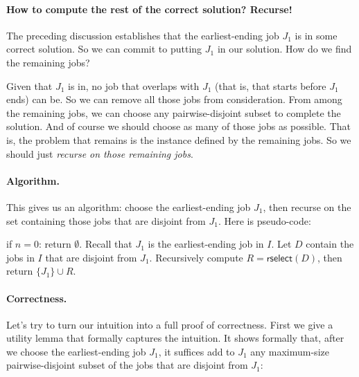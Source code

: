 \paragraph{How to compute the rest of the correct solution?  Recurse!}
The preceding discussion establishes that the earliest-ending job $J_1$ is in some correct solution.
So we can commit to putting $J_1$ in our solution.
How do we find the remaining jobs?

Given that $J_1$ is in, no job that overlaps with $J_1$
(that is, that starts before $J_1$ ends) can be.
So we can remove all those jobs from consideration.
From among the remaining jobs, we can choose any pairwise-disjoint subset to complete the solution.
And of course we should choose as many of those jobs as possible.
That is, the problem that remains is the  instance defined by the remaining jobs.
So we should just \emph{recurse on those remaining jobs}.

\paragraph{Algorithm.}
This gives us an algorithm:
choose the earliest-ending job $J_1$,
then recurse on the set containing those jobs that are disjoint from $J_1$.
Here is pseudo-code:
\begin{myframed}
  \begin{steps}
  \item[{\textsf{rselect}$(I=\{J_1, J_2, \ldots, J_n\})$:}]
    \step if $n = 0$: return $\emptyset$.  
    \step Recall that $J_1$ is the earliest-ending job in $I$.
    \step Let $D$ contain the jobs in $I$ that are disjoint from $J_1$.
    \step Recursively compute $R = \textsf{rselect}(D)$, then return $\{J_1\} \cup R$.
  \end{steps}
\end{myframed}

\paragraph{Correctness.}
Let's try to turn our intuition into a full proof of correctness.
First we give a utility lemma that formally captures the intuition.
It shows formally that, after we choose the earliest-ending job $J_1$,
it suffices add to $J_1$ any maximum-size pairwise-disjoint
subset of the jobs that are disjoint from $J_1$:

